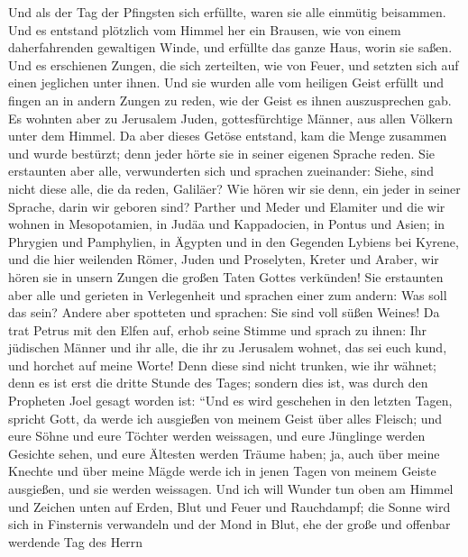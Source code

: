  Und als der Tag der Pfingsten sich erfüllte, waren sie
alle einmütig beisammen.  Und es entstand plötzlich vom
Himmel her ein Brausen, wie von einem daherfahrenden gewaltigen Winde,
und erfüllte das ganze Haus, worin sie saßen.  Und es
erschienen Zungen, die sich zerteilten, wie von Feuer, und setzten sich
auf einen jeglichen unter ihnen.  Und sie wurden alle vom
heiligen Geist erfüllt und fingen an in andern Zungen zu reden, wie der
Geist es ihnen auszusprechen gab.  Es wohnten aber zu
Jerusalem Juden, gottesfürchtige Männer, aus allen Völkern unter dem
Himmel.  Da aber dieses Getöse entstand, kam die Menge
zusammen und wurde bestürzt; denn jeder hörte sie in seiner eigenen
Sprache reden.  Sie erstaunten aber alle, verwunderten
sich und sprachen zueinander: Siehe, sind nicht diese alle, die da
reden, Galiläer?  Wie hören wir sie denn, ein jeder in
seiner Sprache, darin wir geboren sind?  Parther und Meder
und Elamiter und die wir wohnen in Mesopotamien, in Judäa und
Kappadocien, in Pontus und Asien;  in Phrygien und
Pamphylien, in Ägypten und in den Gegenden Lybiens bei Kyrene, und die
hier weilenden Römer,  Juden und Proselyten, Kreter und
Araber, wir hören sie in unsern Zungen die großen Taten Gottes
verkünden!  Sie erstaunten aber alle und gerieten in
Verlegenheit und sprachen einer zum andern: Was soll das sein?
 Andere aber spotteten und sprachen: Sie sind voll süßen
Weines!  Da trat Petrus mit den Elfen auf, erhob seine
Stimme und sprach zu ihnen: Ihr jüdischen Männer und ihr alle, die ihr
zu Jerusalem wohnet, das sei euch kund, und horchet auf meine Worte!
 Denn diese sind nicht trunken, wie ihr wähnet; denn es
ist erst die dritte Stunde des Tages;  sondern dies ist,
was durch den Propheten Joel gesagt worden ist:  ``Und es
wird geschehen in den letzten Tagen, spricht Gott, da werde ich
ausgießen von meinem Geist über alles Fleisch; und eure Söhne und eure
Töchter werden weissagen, und eure Jünglinge werden Gesichte sehen, und
eure Ältesten werden Träume haben;  ja, auch über meine
Knechte und über meine Mägde werde ich in jenen Tagen von meinem Geiste
ausgießen, und sie werden weissagen.  Und ich will Wunder
tun oben am Himmel und Zeichen unten auf Erden, Blut und Feuer und
Rauchdampf;  die Sonne wird sich in Finsternis verwandeln
und der Mond in Blut, ehe der große und offenbar werdende Tag des Herrn
